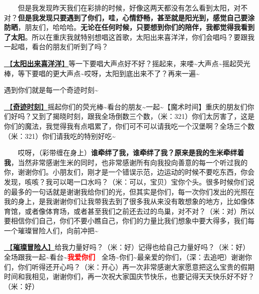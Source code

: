 \documentclass[]{ctexbook}
\begin{document}
  但是我发现昨天我们在彩排的时候，好像这两天都没有怎么看到太阳，对不对？\textbf{但是我发现只要遇到了你们，哇，心情舒畅，甚至就是阳光到，感觉自己要涂防晒}，朋友们，哈哈哈。\textbf{无论在任何时候，只要想到你们的陪伴，我都觉得我看到了太阳}。所以在重庆我就特别想唱这首歌，太阳出来喜洋洋，你们会唱吗？要跟我一起唱，看台的朋友们听到了吗？

\hyperref[happy-sun]{🎵【\textbf{太阳出来喜洋洋}】}等一下要唱大声点好不好？摇起来，来喽\textasciitilde 大声点\textasciitilde 摇起荧光棒，等下要唱的更大声点\textasciitilde 哎呀，太阳到底出来不了？再来一遍\textasciitilde{}

遇到你们就是每一个奇迹时刻\textasciitilde{}

\hyperref[magic-moment]{🎵【\textbf{奇迹时刻}】}摇起你们的荧光棒\textasciitilde 看台的朋友\textasciitilde 一起\textasciitilde【魔术时间】重庆的朋友们你们好吗？又到了揭晓时刻，跟我全场倒数三个数，（米：321）你们太厉害了，这是你们的魔法，我觉得我有点唱累了，你们可不可以请我吃一个汉堡啊？全场三个数（米：321）你们请我吃的特别好吃\textasciitilde{}

  哎呀，（彩带缠在身上）\textbf{谁牵绊了我，谁牵绊了我？原来是我的生米牵绊着我}，当然非常感谢生米的同时，也非常感谢所有向我投向善意的每一个听过我的你，谢谢你们。小朋友们，刚才是一个错误示范，边运动的时候不要吃东西，你会发现，咳咳？我可以喝一口水吗？（米：可以，宝贝）宝你个头。很多时候你们说的最多的一句话就是谢谢我给你们的光，但其实是你们，每一次你们发出的光照在我的身上，是我谢谢你们让我带我去到了很多我从来没有敢想象的地方，比如像体育馆，或者像体育场，或者甚至我们之前还去过的鸟巢，对不对？（米：对）所以要相信你们自己，你们不要小瞧自己，你们的力量比我们想象中要大得多，我们每一个璀璨冒险人们，向前冲把\textasciitilde{}

\hyperref[adventurers]{🎵【\textbf{璀璨冒险人}】}给我力量好吗？（米：好）记得也给自己力量好吗？（米：好）全场跟我一起\textasciitilde 看台\textasciitilde{}\textbf{\textcolor{red}{我爱你们~} } 全场\textasciitilde 你们\textasciitilde 最亲爱的你们，（深：去追吧）谢谢你们，你们听得还开心吗？（米：开心）再一次非常感谢大家愿意把这么宝贵的假期时间和我相见，谢谢你们，再一次祝大家国庆节快乐，也要记得天天快乐好不好？（米：好）
\end{document}
